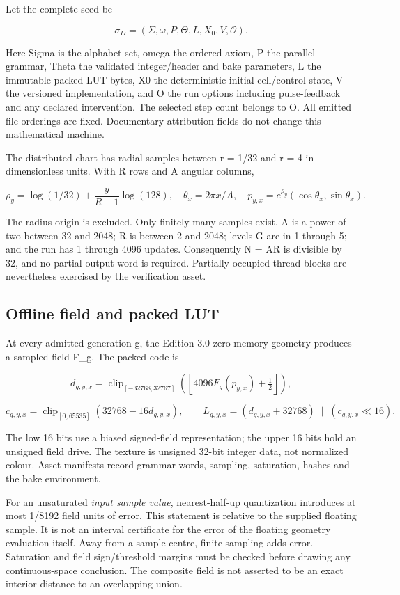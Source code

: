 \documentclass[11pt,a4paper]{article}
\begin{document}
Let the complete seed be

\[\sigma_D=(\Sigma,\omega,P,\Theta,L,X_0,V,\mathcal O).\]

Here Sigma is the alphabet set, omega the ordered axiom, P the parallel grammar, Theta the validated integer/header and bake parameters, L the immutable packed LUT bytes, X0 the deterministic initial cell/control state, V the versioned implementation, and O the run options including pulse-feedback and any declared intervention. The selected step count belongs to O. All emitted file orderings are fixed. Documentary attribution fields do not change this mathematical machine.

The distributed chart has radial samples between r = 1/32 and r = 4 in dimensionless units. With R rows and A angular columns,

\[\rho_y=\log(1/32)+\frac{y}{R-1}\log(128),\quad
\theta_x=2\pi x/A,\quad p_{y,x}=e^{\rho_y}(\cos\theta_x,\sin\theta_x).\]

The radius origin is excluded. Only finitely many samples exist. A is a power of two between 32 and 2048; R is between 2 and 2048; levels G are in 1 through 5; and the run has 1 through 4096 updates. Consequently N = AR is divisible by 32, and no partial output word is required. Partially occupied thread blocks are nevertheless exercised by the verification asset.

\subsection{Offline field and packed LUT}\label{offline-field-and-packed-lut}

At every admitted generation g, the Edition 3.0 zero-memory geometry produces a sampled field F\_g. The packed code is

\[d_{g,y,x}=\operatorname{clip}_{[-32768,32767]}
 \left(\left\lfloor4096F_g(p_{y,x})+\tfrac12\right\rfloor\right),\]

\[c_{g,y,x}=\operatorname{clip}_{[0,65535]}(32768-16d_{g,y,x}),\qquad
L_{g,y,x}=(d_{g,y,x}+32768)\;\mathbin{|}\;(c_{g,y,x}\ll16).\]

The low 16 bits use a biased signed-field representation; the upper 16 bits hold an unsigned field drive. The texture is unsigned 32-bit integer data, not normalized colour. Asset manifests record grammar words, sampling, saturation, hashes and the bake environment.

For an unsaturated \emph{input sample value}, nearest-half-up quantization introduces at most 1/8192 field units of error. This statement is relative to the supplied floating sample. It is not an interval certificate for the error of the floating geometry evaluation itself. Away from a sample centre, finite sampling adds error. Saturation and field sign/threshold margins must be checked before drawing any continuous-space conclusion. The composite field is not asserted to be an exact interior distance to an overlapping union.
\end{document}
